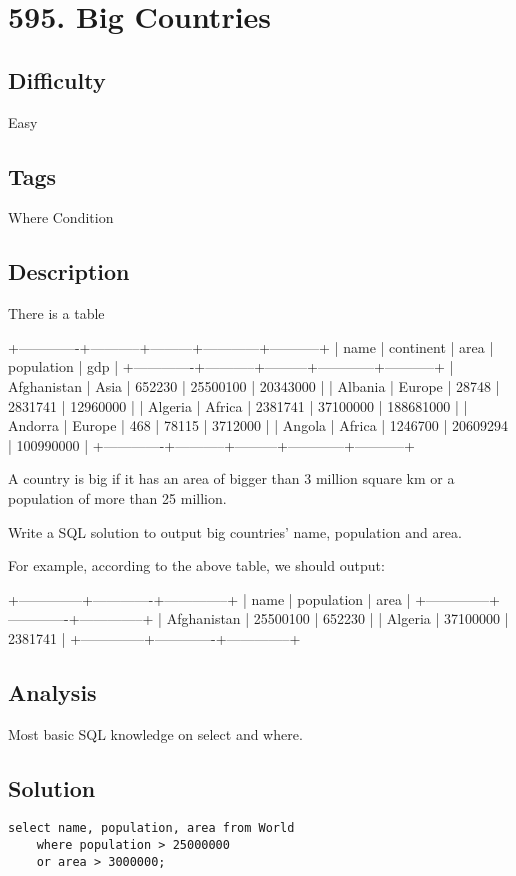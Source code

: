 \tocless\section{595. Big Countries}
\label{db:595}

\subsection*{Difficulty}
Easy

\subsection*{Tags}
Where Condition

\subsection*{Description}
There is a table 
\begin{multilinecode}
+-------------+-----------+---------+------------+-----------+
| name        | continent | area    | population | gdp       |
+-------------+-----------+---------+------------+-----------+
| Afghanistan | Asia      | 652230  | 25500100   | 20343000  |
| Albania     | Europe    | 28748   | 2831741    | 12960000  |
| Algeria     | Africa    | 2381741 | 37100000   | 188681000 |
| Andorra     | Europe    | 468     | 78115      | 3712000   |
| Angola      | Africa    | 1246700 | 20609294   | 100990000 |
+-------------+-----------+---------+------------+-----------+
\end{multilinecode}

A country is big if it has an area of bigger than 3 million square km or a population of more than 25 million.

Write a SQL solution to output big countries' name, population and area.

For example, according to the above table, we should output:
\begin{multilinecode}
+--------------+-------------+--------------+
| name         | population  | area         |
+--------------+-------------+--------------+
| Afghanistan  | 25500100    | 652230       |
| Algeria      | 37100000    | 2381741      |
+--------------+-------------+--------------+
\end{multilinecode}

\subsection*{Analysis}
Most basic SQL knowledge on select and where.

\subsection*{Solution}
\begin{verbatim}
select name, population, area from World
    where population > 25000000
    or area > 3000000;
\end{verbatim}

\newpage
